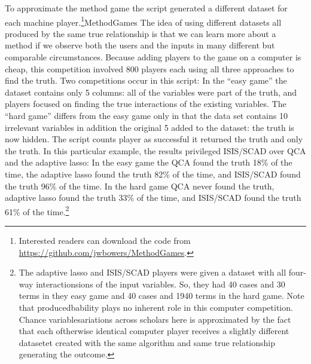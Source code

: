 \documentclass[12pt]{article}
\begin{document}
To approximate the method game the script generated a different dataset for
each machine player.\footnote{Interested readers can download the code from
	\url{https://github.com/jwbowers/MethodGames}.}MethodGames The idea of using
different datasets all produced by the same true relationship is that we can
learn more about a method if we observe both the users and the inputs in many
different but comparable circumstances.  Because adding players to the game on
a computer is cheap, this competition involved 800 players each using all
three approaches to find the truth. Two competitions occur in this script: In
the ``easy game'' the dataset contains only 5 columns: all of the variables
were part of the truth, and players focused on finding the true interactions
of the existing variables. The ``hard game'' differs from the easy game only
in that the data set contains 10 irrelevant variables in addition the original
5 added to the dataset: the truth is now hidden.  The script counts player as
successful it returned the truth and only the truth.  In this particular
example, the results privileged ISIS/SCAD over QCA and the adaptive lasso: In
the easy game the QCA found the truth 18\% of the time, the adaptive lasso
found the truth 82\% of the time, and ISIS/SCAD found the truth 96\% of the
time. In the hard game QCA never found the truth, adaptive lasso found the
truth 33\% of the time, and ISIS/SCAD found the truth 61\% of the
time.\footnote{The adaptive lasso and ISIS/SCAD players were given a dataset
	with all four-way interactionsions of the input variables. So, they had 40
	cases and 30 terms in they easy game and 40 cases and 1940 terms in the
	hard game. Note that producedbability plays no inherent role in this computer
	competition. Chance variablesariations across scholars here is approximated by the
	fact that each oftherwise identical computer player receives a slightly
	different datasetet created with the same algorithm and same true
	relationship generating the outcome.}
\end{document}

